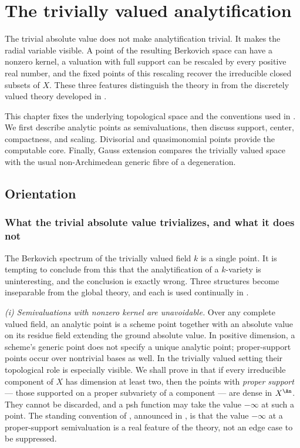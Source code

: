 \chapter{The trivially valued analytification}
\label{chap:trivial-analytification}

The trivial absolute value does not make analytification trivial.  It makes
the radial variable visible.  A point of the resulting Berkovich space can
have a nonzero kernel, a valuation with full support can be rescaled by every
positive real number, and the fixed points of this rescaling recover the
irreducible closed subsets of $X$.  These three features distinguish the
theory in  from
the discretely valued theory developed in
.

This chapter fixes the underlying topological space and the conventions used
in .
We first describe analytic points as semivaluations, then discuss support,
center, compactness, and scaling.  Divisorial and quasimonomial points provide
the computable core.  Finally, Gauss extension compares the trivially valued
space with the usual non-Archimedean generic fibre of a degeneration.

\section{Orientation}
\label{sec:ch32-orientation}

\subsection{What the trivial absolute value trivializes, and what it does not}
\label{sec:ch32-what-is-trivial}

The Berkovich spectrum of the trivially valued field $k$ is a single point.
It is tempting to conclude from this that the analytification of a
$k$-variety is uninteresting, and the conclusion is exactly wrong.  Three
structures become inseparable from the global theory, and each is used
continually in .

\emph{(i) Semivaluations with nonzero kernel are unavoidable.}
Over any complete valued field, an analytic point is a scheme point
together with an absolute value on its residue field extending the ground
absolute value.  In positive dimension, a scheme's generic point does
not specify a unique analytic point; proper-support points occur over nontrivial bases
as well.  In the trivially valued setting their topological role is
especially visible.  We shall prove in
 that if every irreducible component of
$X$ has dimension at least two, then the points with \emph{proper support}
--- those supported on a proper subvariety of a component --- are dense
in $X^{\An}$.  They
cannot be discarded, and a psh function may take the value $-\infty$ at
such a point.  The standing convention of , announced in
, is that the value $-\infty$ at a proper-support
semivaluation is a real feature of the theory, not an edge case to be
suppressed.

